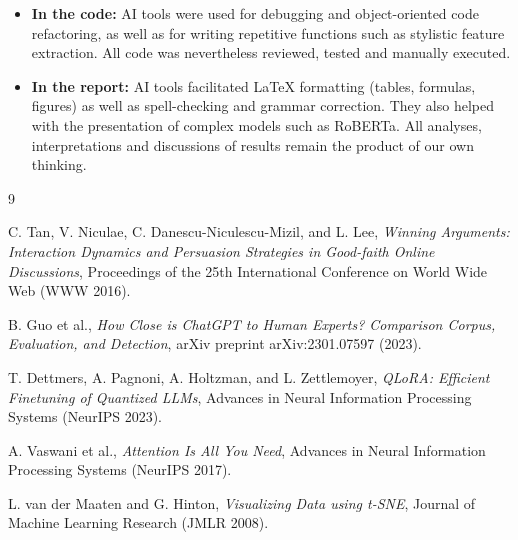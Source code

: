 \documentclass[11pt,a4paper]{article}
\begin{document}
\begin{itemize}
    \item \textbf{In the code:} AI tools were used for debugging
    and object-oriented code refactoring, as well as for writing repetitive
    functions such as stylistic feature extraction. All code was nevertheless
    reviewed, tested and manually executed.
    \item \textbf{In the report:} AI tools facilitated LaTeX formatting
    (tables, formulas, figures) as well as spell-checking and grammar
    correction. They also helped with the presentation of complex models such
    as RoBERTa. All analyses, interpretations and discussions of results
    remain the product of our own thinking.
\end{itemize}
\newpage
\begin{thebibliography}{9}

C. Tan, V. Niculae, C. Danescu-Niculescu-Mizil, and L. Lee,
\textit{Winning Arguments: Interaction Dynamics and Persuasion Strategies in Good-faith Online Discussions},
Proceedings of the 25th International Conference on World Wide Web (WWW 2016).

B. Guo et al.,
\textit{How Close is ChatGPT to Human Experts? Comparison Corpus, Evaluation, and Detection},
arXiv preprint arXiv:2301.07597 (2023).

T. Dettmers, A. Pagnoni, A. Holtzman, and L. Zettlemoyer,
\textit{QLoRA: Efficient Finetuning of Quantized LLMs},
Advances in Neural Information Processing Systems (NeurIPS 2023).

A. Vaswani et al.,
\textit{Attention Is All You Need},
Advances in Neural Information Processing Systems (NeurIPS 2017).

L. van der Maaten and G. Hinton,
\textit{Visualizing Data using t-SNE},
Journal of Machine Learning Research (JMLR 2008).

\end{thebibliography}
\end{document}
